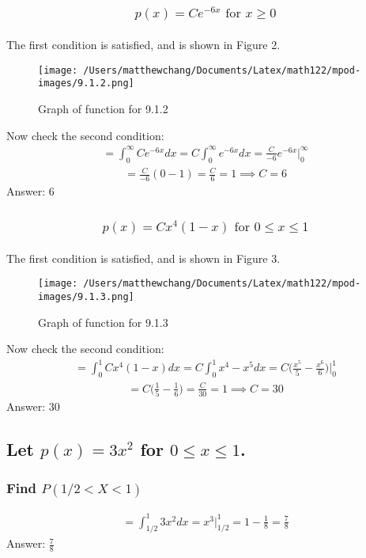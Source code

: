 \documentclass{article}
\begin{document}
\subsubsection{
	\begin{align*}
		p(x) = Ce^{-6x} \text{ for } x \geq 0
	\end{align*}
}
The first condition is satisfied, and is shown in Figure 2. 
\begin{figure}
	\centering
	\texttt{[image: /Users/matthewchang/Documents/Latex/math122/mpod-images/9.1.2.png]}
	\caption{Graph of function for 9.1.2}
\end{figure}
Now check the second condition:
\begin{align*}
	= \int_0^{\infty}{Ce^{-6x}dx} = C \int_0^{\infty}{e^{-6x}dx} = \frac{C}{-6} e^{-6x} \bigg|_0^{\infty}
\end{align*}
\begin{align*}
	= \frac{C}{-6} (0 - 1) = \frac{C}{6} = 1\implies C = 6
\end{align*}
Answer: $6$

\subsubsection{
	\begin{align*}
		p(x) = Cx^4(1 - x) \text{ for } 0 \leq x \leq 1
	\end{align*}
}
The first condition is satisfied, and is shown in Figure 3. 
\begin{figure}
	\centering
	\texttt{[image: /Users/matthewchang/Documents/Latex/math122/mpod-images/9.1.3.png]}
	\caption{Graph of function for 9.1.3}
\end{figure}
Now check the second condition:
\begin{align*}
	= \int_0^1{Cx^4(1 - x)dx} = C \int_0^1{x^4 - x^5 dx} = C \bigg( \frac{x^5}{5} - \frac{x^6}{6} \bigg) \bigg|_0^1
\end{align*}
\begin{align*}
	= C \bigg( \frac{1}{5} - \frac{1}{6} \bigg) = \frac{C}{30} = 1 \implies C = 30
\end{align*}
Answer: $30$

\subsection{Let $p(x)=3x^2$ for $0 \leq x \leq 1$.}
\subsubsection{Find $P(1/2 < X < 1)$}
\begin{align*}
	= \int_{1/2}^1{3x^2 dx} = x^3 \bigg|_{1/2}^1 = 1 - \frac{1}{8} = \frac{7}{8}
\end{align*}
Answer: $\frac{7}{8}$
\end{document}
